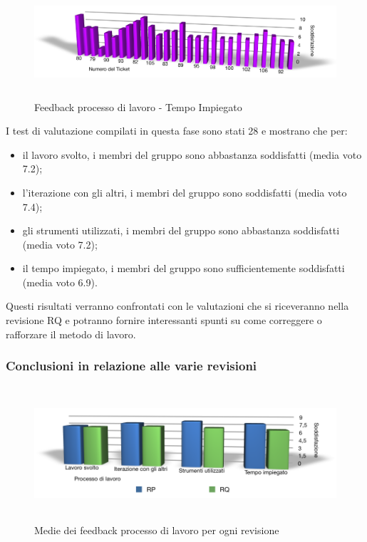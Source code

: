 \begin{figure}[htbp]
  \centering
  \includegraphics[height=4.1cm]{img/PQ/TempoImpiegato.png}
\caption{Feedback processo di lavoro - Tempo Impiegato}
\end{figure}

\newpage
I test di valutazione compilati in questa fase sono stati 28 e mostrano che
per:
\begin{itemize}
  \item il lavoro svolto, i membri del gruppo sono abbastanza
  soddisfatti (media voto 7.2);
  \item l'iterazione con gli altri, i membri del gruppo sono soddisfatti
  (media voto 7.4);
  \item gli strumenti utilizzati, i membri del gruppo
  sono abbastanza soddisfatti (media voto 7.2);
  \item il tempo impiegato, i membri del gruppo
  sono sufficientemente soddisfatti (media voto 6.9).\\
\end{itemize}

Questi risultati verranno confrontati con le valutazioni che si riceveranno
nella revisione RQ e potranno fornire interessanti spunti su come correggere o
rafforzare il metodo di lavoro.

\subsubsection*{Conclusioni in relazione alle varie revisioni}

\begin{figure}[htbp]
  \centering
  \includegraphics[height=5cm]{img/PQ/RiassuntoFeedback.png}
\caption{Medie dei feedback processo di lavoro per ogni revisione}
\end{figure}

